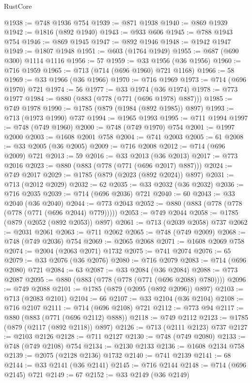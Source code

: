 \begin{lexlean}{RustCore}
\begin{coremodule}
@1938 := @748 @1936 @754
@1939 := @871 @1938
@1940 := @869 @1939
@1942 := @1816 (@892 @1940)
@1943 := @933 @606
@1945 := @788 @1943 @754
@1946 := @869 @1945
@1947 := @892 @1946
@1948 := @1942 @1947
@1949 := @1807 @1948
@1951 := @603 (@1764 @1949)
@1955 := @687 (@690 @300) @1114 @1116
@1956 := 57
@1959 := @33 @1956 (@36 @1956)
@1960 := @716 @1959
@1965 := @713 (@714 (@696 @1960) @721 @1168)
@1966 := 58
@1969 := @33 @1966 (@36 @1966)
@1970 := @716 @1969
@1973 := @714 (@696 @1970) @721
@1974 := 56
@1977 := @33 @1974 (@36 @1974)
@1978 := @773 @1977
@1984 := @880 (@883 (@778 (@771 (@696 @1978) @887)))
@1985 := @749 @1978
@1990 := @1785 (@879 (@1984 (@892 @1985)) @897)
@1993 := @713 (@1973 @1990) @737
@1994 := @1965 @1993
@1995 := @711 @1994
@1997 := @748 (@749 @1960)
@2000 := @748 (@749 @1970) @754
@2001 := @1997 @2000
@2003 := @1608 @2001 @758
@2004 := @741 @2003
@2005 := 61
@2008 := @33 @2005 (@36 @2005)
@2009 := @716 @2008
@2012 := @714 (@696 @2009) @721
@2013 := 59
@2016 := @33 @2013 (@36 @2013)
@2017 := @773 @2016
@2023 := @880 (@883 (@778 (@771 (@696 @2017) @887)))
@2024 := @749 @2017
@2029 := @1785 (@879 (@2023 (@892 @2024)) @897)
@2031 := @713 (@2012 @2029)
@2032 := 62
@2035 := @33 @2032 (@36 @2032)
@2036 := @716 @2035
@2039 := @714 (@696 @2036) @721
@2040 := 60
@2043 := @33 @2040 (@36 @2040)
@2044 := @773 @2043
@2052 := @880 (@883 (@778 (@778 (@778 (@771 (@696 @2044) @779)))))
@2053 := @749 @2044
@2058 := @1785 (@879 (@2052 (@892 @2053)) @897)
@2061 := @713 (@2039 @2058) @737
@2062 := @2031 @2061
@2063 := @711 @2062
@2065 := @748 (@749 @2009)
@2068 := @748 (@749 @2036) @754
@2069 := @2065 @2068
@2071 := @1608 @2069 @758
@2074 := @2004 (@2063 @2071) @1732
@2075 := @741 @2074
@2076 := 65
@2079 := @33 @2076 (@36 @2076)
@2080 := @716 @2079
@2083 := @714 (@696 @2080) @721
@2084 := 63
@2087 := @33 @2084 (@36 @2084)
@2088 := @773 @2087
@2095 := @880 (@883 (@778 (@778 (@771 (@696 @2088) @780))))
@2096 := @749 @2088
@2101 := @1785 (@879 (@2095 (@892 @2096)) @897)
@2103 := @713 (@2083 @2101)
@2104 := 66
@2107 := @33 @2104 (@36 @2104)
@2108 := @716 @2107
@2111 := @714 (@696 @2108) @721
@2112 := @773 @94
@2117 := @880 (@883 (@771 (@696 @2112) @888))
@2118 := @749 @2112
@2123 := @1785 (@879 (@2117 (@892 @2118)) @897)
@2126 := @713 (@2111 @2123) @737
@2127 := @2103 @2126
@2128 := @711 @2127
@2130 := @748 (@749 @2080)
@2133 := @748 (@749 @2108) @754
@2134 := @2130 @2133
@2136 := @1608 @2134 @758
@2139 := @2075 (@2128 @2136) @1732
@2140 := @741 @2139
@2141 := 68
@2144 := @33 @2141 (@36 @2141)
@2145 := @716 @2144
@2148 := @714 (@696 @2145) @721
@2149 := 67
@2152 := @33 @2149 (@36 @2149)

\end{coremodule}
\end{lexlean}
